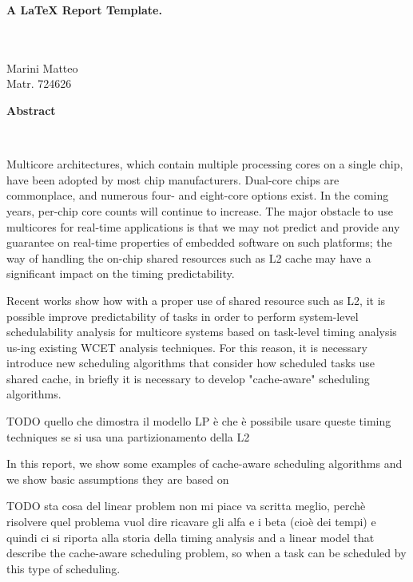 \documentclass[a4paper,10pt]{article}
\newenvironment*{mytitle}{\begin{LARGE}\bf}{\end{LARGE}\\[1.5ex]}%
\newenvironment*{myabstract}{\begin{Large}\bf}{\end{Large}\\[2.5ex]}%
\begin{document}
\begin{mytitle} A LaTeX Report Template. \end{mytitle}
%
%
\\
Marini Matteo\\
Matr. 724626\\
\hspace{10ex}

\begin{myabstract} Abstract \end{myabstract}

Multicore architectures, which contain multiple processing cores on a single chip, have been adopted by most chip manufacturers.
Dual-core chips are commonplace, and numerous four- and eight-core options exist. In the coming years, per-chip core counts will continue to increase.
The major obstacle to use multicores for real-time applications is that we may not predict and provide any guarantee on real-time properties 
of embedded software on such platforms; the way of handling the on-chip shared resources such as L2 cache may have a significant impact on the timing
predictability.

Recent works show how with a proper use of shared resource such as L2, it is possible improve predictability of tasks in order to perform 
system-level schedulability analysis for multicore systems based on task-level timing analysis us-ing existing WCET analysis techniques.
For this reason, it is necessary introduce new scheduling algorithms that consider how scheduled tasks use shared cache, in briefly 
it is necessary to develop "cache-aware" scheduling algorithms.

TODO quello che dimostra il modello LP è che è possibile usare queste timing techniques se si usa una partizionamento della L2

In this report, we show some examples of cache-aware scheduling algorithms and we show basic assumptions they are based on 

TODO sta cosa del linear problem non mi piace va scritta meglio, perchè risolvere quel problema vuol dire ricavare gli alfa e i beta (cioè dei tempi)
e quindi ci si riporta alla storia della timing analysis
and a linear model that describe the cache-aware scheduling problem, so when a task can be scheduled by this type of scheduling.
\end{document}
